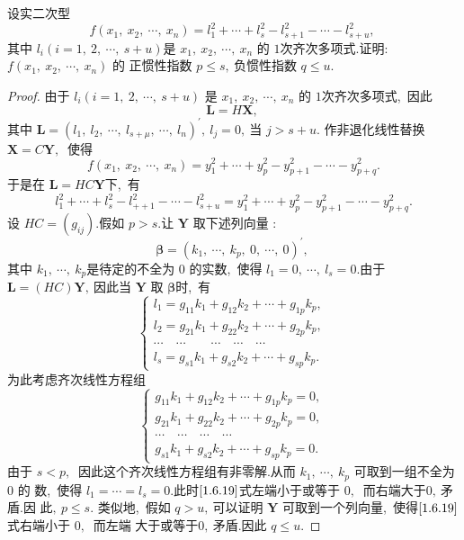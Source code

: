 \newpage
\begin{problem}
	设实二次型
	$$f\left(x_{1},\  x_{2},\  \cdots,\  x_{n}\right)=l_{1}^{2}+\cdots+l_{s}^{2}-l_{s+1}^{2}-\cdots-l_{s+u}^{2},\ $$
	其中  $l_{i}(i=1,\ 2,\  \cdots,\  s+u)  $是  $x_{1},\  x_{2},\  \cdots,\  x_{n} $ 的 $1 $次齐次多项式.证明:$  f\left(x_{1},\  x_{2},\  \cdots,\  x_{n}\right)$  的 正惯性指数  $p \leqslant s ,\  $负惯性指数  $q \leqslant u  .$
\end{problem}
\begin{proof}
	由于 $ l_{i}(i=1,\ 2,\  \cdots,\  s+u) $ 是 $ x_{1},\  x_{2},\  \cdots,\  x_{n} $ 的 $1 $次齐次多项式,\  因此
	$$\boldsymbol{L}=H \boldsymbol{X},\ $$
	其中  $\boldsymbol{L}=\left(l_{1},\  l_{2},\  \cdots,\  l_{s+\mu},\  \cdots,\  l_{n}\right)^{\prime},\  l_{j}=0 ,\  $当  $j>s+u  .$
	作非退化线性替换 $ \boldsymbol{X}=C \boldsymbol{Y} ,\ $ 使得
	$$f\left(x_{1},\  x_{2},\  \cdots,\  x_{n}\right)=y_{1}^{2}+\cdots+y_{p}^{2}-y_{p+1}^{2}-\cdots-y_{p+q}^{2} .$$
	于是在 $ \boldsymbol{L}=H C \boldsymbol{Y}  $下,\  有
	\begin{equation}
		l_{1}^{2}+\cdots+l_{s}^{2}-l_{++1}^{2}-\cdots-l_{s+u}^{2}=y_{1}^{2}+\cdots+y_{p}^{2}-y_{p+1}^{2}-\cdots-y_{p+q}^{2} .\label{1.6.19}
	\end{equation}
	设 $ H C=\left(g_{i j}\right) .$假如  $p>s  .$让 $ \boldsymbol{Y} $ 取下述列向量 :
	$$\boldsymbol{\beta}=\left(k_{1},\  \cdots,\  k_{p},\  0,\  \cdots,\  0\right)^{\prime},\ $$
	其中 $ k_{1},\  \cdots,\  k_{p}  $是待定的不全为 0 的实数,\  使得 $ l_{1}=0,\  \cdots,\  l_{s}=0 .$由于 $ \boldsymbol{L}=(H C) \boldsymbol{Y} ,\  $因此当 $ \boldsymbol{Y} $ 取 $ \boldsymbol{\beta}  $时,\  有
	$$\left\{\begin{array}{l}
		l_{1}=g_{11} k_{1}+g_{12} k_{2}+\cdots+g_{1 p} k_{p},\  \\
		l_{2}=g_{21} k_{1}+g_{22} k_{2}+\cdots+g_{2 p} k_{p},\  \\
		\cdots \quad \cdots \quad \quad \cdots \quad \cdots \quad \cdots \\
		l_{s}=g_{s 1} k_{1}+g_{s 2} k_{2}+\cdots+g_{s p} k_{p} .
	\end{array}\right.$$
	为此考虑齐次线性方程组
	$$\left\{\begin{array}{l}
		g_{11} k_{1}+g_{12} k_{2}+\cdots+g_{1 p} k_{p}=0,\  \\
		g_{21} k_{1}+g_{22} k_{2}+\cdots+g_{2 p} k_{p}=0,\  \\
		\cdots \quad \cdots \quad \cdots \quad \cdots \\
		g_{s 1} k_{1}+g_{s 2} k_{2}+\cdots+g_{s p} k_{p}=0 .
	\end{array}\right.$$
	由于  $s<p ,\ $ 因此这个齐次线性方程组有非零解.从而 $ k_{1},\  \cdots,\  k_{p} $ 可取到一组不全为 0 的 数,\  使得 $ l_{1}=\cdots=l_{s}=0 . $此时$\eqref{1.6.19}$式左端小于或等于 $0 ,\ $ 而右端大于$ 0 ,\  $矛盾.因 此$,\   p \leqslant s .$
	类似地,\  假如 $ q>u ,\  $可以证明 $ \boldsymbol{Y} $ 可取到一个列向量,\  使得$\eqref{1.6.19}$式右端小于 $0 ,\ $ 而左端 大于或等于$ 0 ,\  $矛盾.因此  $q \leqslant u .$
\end{proof}
